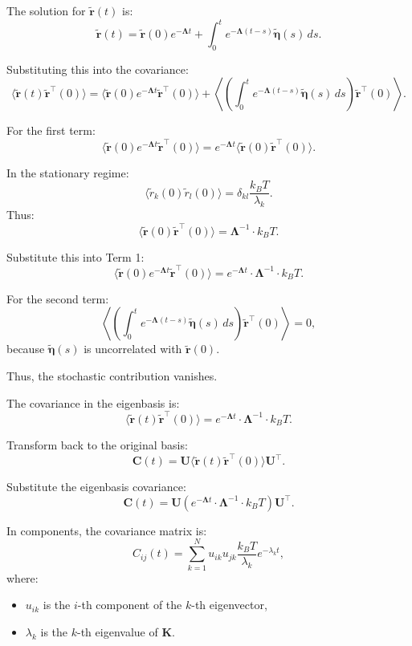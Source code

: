 \documentclass[English, Lau, oneside]{sapthesis}
\begin{document}
The solution for \(\tilde{\mathbf{r}}(t)\) is:
\[
\tilde{\mathbf{r}}(t) = \tilde{\mathbf{r}}(0) e^{-\boldsymbol{\Lambda} t} + \int_0^t e^{-\boldsymbol{\Lambda} (t-s)} \tilde{\boldsymbol{\eta}}(s) \, ds.
\]

Substituting this into the covariance:
\[
\langle \tilde{\mathbf{r}}(t) \tilde{\mathbf{r}}^\top(0) \rangle = \langle \tilde{\mathbf{r}}(0) e^{-\boldsymbol{\Lambda} t} \tilde{\mathbf{r}}^\top(0) \rangle + \left\langle \left( \int_0^t e^{-\boldsymbol{\Lambda} (t-s)} \tilde{\boldsymbol{\eta}}(s) \, ds \right) \tilde{\mathbf{r}}^\top(0) \right\rangle.
\]

For the first term:
\[
\langle \tilde{\mathbf{r}}(0) e^{-\boldsymbol{\Lambda} t} \tilde{\mathbf{r}}^\top(0) \rangle = e^{-\boldsymbol{\Lambda} t} \langle \tilde{\mathbf{r}}(0) \tilde{\mathbf{r}}^\top(0) \rangle.
\]

In the stationary regime:
\[
\langle \tilde{r}_k(0) \tilde{r}_l(0) \rangle = \delta_{kl} \frac{k_B T}{\lambda_k}.
\]
Thus:
\[
\langle \tilde{\mathbf{r}}(0) \tilde{\mathbf{r}}^\top(0) \rangle = \boldsymbol{\Lambda}^{-1} \cdot k_B T.
\]

Substitute this into Term 1:
\[
\langle \tilde{\mathbf{r}}(0) e^{-\boldsymbol{\Lambda} t} \tilde{\mathbf{r}}^\top(0) \rangle = e^{-\boldsymbol{\Lambda} t} \cdot \boldsymbol{\Lambda}^{-1} \cdot k_B T.
\]

For the second term:
\[
\left\langle \left( \int_0^t e^{-\boldsymbol{\Lambda} (t-s)} \tilde{\boldsymbol{\eta}}(s) \, ds \right) \tilde{\mathbf{r}}^\top(0) \right\rangle = 0,
\]
because \(\tilde{\boldsymbol{\eta}}(s)\) is uncorrelated with \(\tilde{\mathbf{r}}(0)\).

Thus, the stochastic contribution vanishes.

The covariance in the eigenbasis is:
\[
\langle \tilde{\mathbf{r}}(t) \tilde{\mathbf{r}}^\top(0) \rangle = e^{-\boldsymbol{\Lambda} t} \cdot \boldsymbol{\Lambda}^{-1} \cdot k_B T.
\]

Transform back to the original basis:
\[
\mathbf{C}(t) = \mathbf{U} \langle \tilde{\mathbf{r}}(t) \tilde{\mathbf{r}}^\top(0) \rangle \mathbf{U}^\top.
\]

Substitute the eigenbasis covariance:
\[
\mathbf{C}(t) = \mathbf{U} \left( e^{-\boldsymbol{\Lambda} t} \cdot \boldsymbol{\Lambda}^{-1} \cdot k_B T \right) \mathbf{U}^\top.
\]


In components, the covariance matrix is:
\[
C_{ij}(t) = \sum_{k=1}^N u_{ik} u_{jk} \frac{k_B T}{\lambda_k} e^{-\lambda_k t},
\]
where:
\begin{itemize}
    \item \(u_{ik}\) is the \(i\)-th component of the \(k\)-th eigenvector,
    \item \(\lambda_k\) is the \(k\)-th eigenvalue of \(\mathbf{K}\).
\end{itemize}
\end{document}
